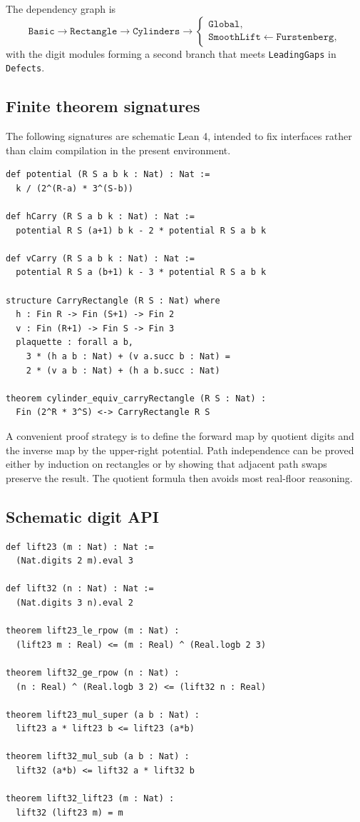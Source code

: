 \documentclass[11pt]{article}
\theoremstyle{definition}
\theoremstyle{remark}
\begin{document}
The dependency graph is
\[
 \texttt{Basic}\to\texttt{Rectangle}\to\texttt{Cylinders}\to
 \begin{cases}
  \texttt{Global},\\
  \texttt{SmoothLift}\leftarrow\texttt{Furstenberg},
 \end{cases}
\]
with the digit modules forming a second branch that meets
\texttt{LeadingGaps} in \texttt{Defects}.

\subsection{Finite theorem signatures}

The following signatures are schematic Lean 4, intended to fix interfaces rather
than claim compilation in the present environment.

\begin{lstlisting}[caption={Schematic finite carry API}]
def potential (R S a b k : Nat) : Nat :=
  k / (2^(R-a) * 3^(S-b))

def hCarry (R S a b k : Nat) : Nat :=
  potential R S (a+1) b k - 2 * potential R S a b k

def vCarry (R S a b k : Nat) : Nat :=
  potential R S a (b+1) k - 3 * potential R S a b k

structure CarryRectangle (R S : Nat) where
  h : Fin R -> Fin (S+1) -> Fin 2
  v : Fin (R+1) -> Fin S -> Fin 3
  plaquette : forall a b,
    3 * (h a b : Nat) + (v a.succ b : Nat) =
    2 * (v a b : Nat) + (h a b.succ : Nat)

theorem cylinder_equiv_carryRectangle (R S : Nat) :
  Fin (2^R * 3^S) <-> CarryRectangle R S
\end{lstlisting}

A convenient proof strategy is to define the forward map by quotient digits and the
inverse map by the upper-right potential.  Path independence can be proved either by
induction on rectangles or by showing that adjacent path swaps preserve the result.
The quotient formula then avoids most real-floor reasoning.

\subsection{Schematic digit API}

\begin{lstlisting}[caption={Schematic digit-lift statements}]
def lift23 (m : Nat) : Nat :=
  (Nat.digits 2 m).eval 3

def lift32 (n : Nat) : Nat :=
  (Nat.digits 3 n).eval 2

theorem lift23_le_rpow (m : Nat) :
  (lift23 m : Real) <= (m : Real) ^ (Real.logb 2 3)

theorem lift32_ge_rpow (n : Nat) :
  (n : Real) ^ (Real.logb 3 2) <= (lift32 n : Real)

theorem lift23_mul_super (a b : Nat) :
  lift23 a * lift23 b <= lift23 (a*b)

theorem lift32_mul_sub (a b : Nat) :
  lift32 (a*b) <= lift32 a * lift32 b

theorem lift32_lift23 (m : Nat) :
  lift32 (lift23 m) = m
\end{lstlisting}
\end{document}
